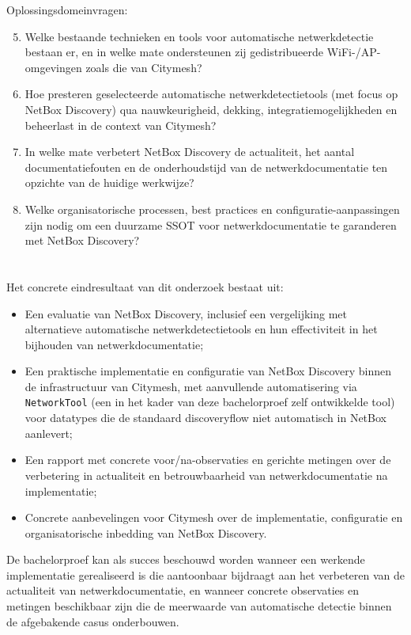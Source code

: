 Oplossingsdomeinvragen:
\begin{enumerate}
  \setcounter{enumi}{4}
  \item Welke bestaande technieken en tools voor automatische netwerkdetectie bestaan er, en in welke mate ondersteunen zij gedistribueerde WiFi-/AP-omgevingen zoals die van Citymesh?
  \item Hoe presteren geselecteerde automatische netwerkdetectietools (met focus op NetBox Discovery) qua nauwkeurigheid, dekking, integratiemogelijkheden en beheerlast in de context van Citymesh?
  \item In welke mate verbetert NetBox Discovery de actualiteit, het aantal documentatiefouten en de onderhoudstijd van de netwerkdocumentatie ten opzichte van de huidige werkwijze?
  \item Welke organisatorische processen, best practices en configuratie-aanpassingen zijn nodig om een duurzame SSOT voor netwerkdocumentatie te garanderen met NetBox Discovery?
\end{enumerate}

\section{}%
\label{sec:onderzoeksdoelstelling}

Het concrete eindresultaat van dit onderzoek bestaat uit:
\begin{itemize}
  \item Een evaluatie van NetBox Discovery, inclusief een vergelijking met alternatieve automatische netwerkdetectietools en hun effectiviteit in het bijhouden van netwerkdocumentatie;
  \item Een praktische implementatie en configuratie van NetBox Discovery binnen de infrastructuur van Citymesh, met aanvullende automatisering via \texttt{NetworkTool} (een in het kader van deze bachelorproef zelf ontwikkelde tool) voor datatypes die de standaard discoveryflow niet automatisch in NetBox aanlevert;
  \item Een rapport met concrete voor/na-observaties en gerichte metingen over de verbetering in actualiteit en betrouwbaarheid van netwerkdocumentatie na implementatie;
  \item Concrete aanbevelingen voor Citymesh over de implementatie, configuratie en organisatorische inbedding van NetBox Discovery.
\end{itemize}

De bachelorproef kan als succes beschouwd worden wanneer een werkende implementatie gerealiseerd is die aantoonbaar bijdraagt aan het verbeteren van de actualiteit van netwerkdocumentatie, en wanneer concrete observaties en metingen beschikbaar zijn die de meerwaarde van automatische detectie binnen de afgebakende casus onderbouwen.
